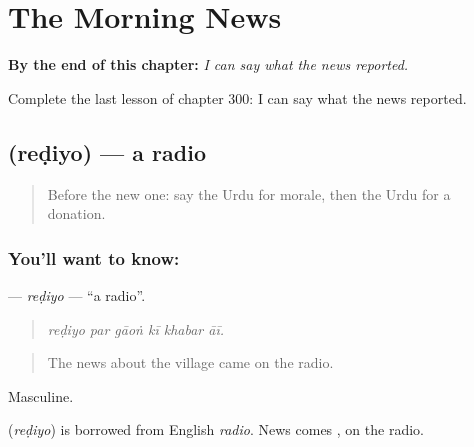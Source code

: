 
\chapter{The Morning News}
\label{ch:ur-the-morning-news}

\begin{chapteropening}
\textbf{By the end of this chapter:} \emph{I can say what the news reported.}

Complete the last lesson of chapter 300: I can say what the news reported.
\end{chapteropening}

\section[\texorpdfstring{\ur{ریڈیو} (reḍiyo)}{ریڈیو (reḍiyo)}]{ (reḍiyo) — a radio}

\label{lesson:UR-C300-rediyo}



\begin{quote}
Before the new one: say the Urdu for morale, then the Urdu for a donation.
\end{quote}

\subsection*{You'll want to know: }
\textbf{} — \emph{reḍiyo} — \textquotedblleft{}a radio\textquotedblright{}.

\begin{quote}
     
\end{quote}

\begin{quote}
\emph{reḍiyo par gāoṅ kī khabar āī.}
\end{quote}

\begin{quote}
The news about the village came on the radio.
\end{quote}

Masculine.

\begin{cousinweb}
\textbf{} (\emph{reḍiyo}) is borrowed from English \emph{radio}. News comes \textbf{ }, on the radio.
\end{cousinweb}

